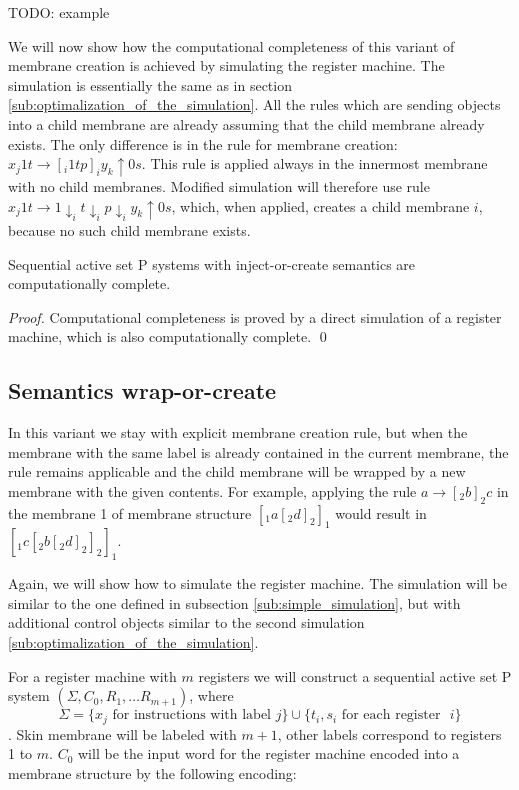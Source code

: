 \documentclass[llncs,submission,copyright,creativecommons]{../lib/lncs/llncs}
\begin{document}
TODO: example

We will now show how the computational completeness of this variant of membrane creation is achieved by simulating the register machine. The simulation is essentially the same as in section \ref{sub:optimalization_of_the_simulation}. All the rules which are sending objects into a child membrane are already assuming that the child membrane already exists. The only difference is in the rule for membrane creation: $x_j1t \rightarrow [_i 1tp]_iy_k\uparrow 0s$. This rule is applied always in the innermost membrane with no child membranes. Modified simulation will therefore use rule $x_j1t \rightarrow 1\downarrow_i t\downarrow_i p\downarrow_i y_k\uparrow 0s$, which, when applied, creates a child membrane $i$, because no such child membrane exists.

\begin{theorem}
  Sequential active set P systems with inject-or-create semantics are computationally complete.
\end{theorem}

\begin{proof}
  Computational completeness is proved by a direct simulation of a register machine, which is also computationally complete. \qed
\end{proof}


\subsection{Semantics wrap-or-create} %
\label{sub:semantics_wrap_or_create}

In this variant we stay with explicit membrane creation rule, but when the membrane with the same label is already contained in the current membrane, the rule remains applicable and the child membrane will be wrapped by a new membrane with the given contents. For example, applying the rule $a \rightarrow [_2 b ]_2 c$ in the membrane 1 of membrane structure $[_1 a [_2 d ]_2 ]_1$ would result in $[_1 c [_2 b [_2 d ]_2 ]_2 ]_1$.

Again, we will show how to simulate the register machine. The simulation will be similar to the one defined in subsection \ref{sub:simple_simulation}, but with additional control objects similar to the second simulation \ref{sub:optimalization_of_the_simulation}.

For a register machine with $m$ registers we will construct a sequential active set P system $(\Sigma, C_0, R_1, \ldots R_{m+1})$, where $$\Sigma = \{x_j \text{~for instructions with label~} j\}\cup\{t_i, s_i \text{~for each register ~}i\}$$. Skin membrane will be labeled with $m+1$, other labels correspond to registers 1 to $m$. $C_0$ will be the input word for the register machine encoded into a membrane structure by the following encoding: 
\end{document}

